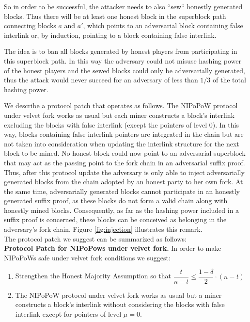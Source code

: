 So in order to be successful, the attacker needs to also ``sew`` honestly generated blocks. Thus there will be at least one honest block in the superblock path connecting blocks $a$ and $a'$, which points to an adversarial block containing false interlink or, by induction, pointing to a block containing false interlink.

The idea is to ban all blocks generated by honest players from participating in this superblock path. In this way the adversary could not misuse hashing power of the honest players and the sewed blocks could only be adversarially generated, thus the attack would never succeed for an adversary of less than $1/3$ of the total hashing power. 

We describe a protocol patch that operates as follows. The NIPoPoW protocol under velvet fork works as usual but each miner constructs a block's interlink excluding the blocks with false interlink (except the pointers of level 0). In this way, blocks containing false interlink pointers are integrated in the chain but are not taken into consideration when updating the interlink structure for the next block to be mined. No honest block could now point to an adversarial superblock that may act as the passing point to the fork chain in an adversarial suffix proof. 
Thus, after this protocol update the adversary is only able to inject adversarially generated blocks from the chain adopted by an honest party to her own fork.
At the same time, adversarially generated blocks cannot participate in an honestly generated suffix proof, as these blocks do not form a valid chain along with honestly mined blocks. Consequently, as far as the hashing power included in a suffix proof is concerned, these blocks can be conceived as belonging in the adversary's fork chain. Figure \ref{fig:injection} illustrates this remark.\\
The protocol patch we suggest can be summarized as follows:\\


\textbf{Protocol Patch for NIPoPows under velvet fork.} In order to make NIPoPoWs safe under velvet fork conditions we suggest:
\begin{enumerate}
\item Strengthen the Honest Majority Assumption so that $\dfrac{t}{n-t} \leq \dfrac{1-\delta}{2} \cdot (n-t)$
\item The NIPoPoW protocol under velvet fork works as usual but a miner constructs a block's interlink without considering the blocks with false interlink except for pointers of level $\mu = 0$.
\end{enumerate}

